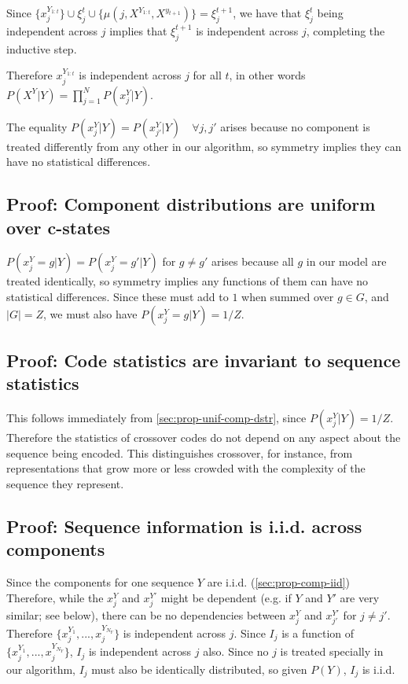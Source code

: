 \documentclass{article}
\begin{document}
Since $\{x_j^{Y_{1:t}}\} \cup \xi^t_j \cup \{\mu(j, X^{Y_{1:t}}, X^{y_{t+1}})\} = \xi^{t+1}_j$, we have that $\xi^t_j$ being independent across $j$ implies that $\xi^{t+1}_j$ is independent across $j$, completing the inductive step.

Therefore $x_j^{Y_{1:t}}$ is independent across $j$ for all $t$, in other words $P(X^Y|Y) = \prod\limits_{j=1}^N P(x^Y_j|Y)$.

The equality $P(x^Y_j|Y) = P(x^Y_{j'}|Y) \quad \forall j, j'$ arises because no component is treated differently from any other in our algorithm, so symmetry implies they can have no statistical differences.

\subsection{Proof: Component distributions are uniform over c-states}

$P(x^Y_j = g|Y) = P(x^Y_j = g'|Y)$ for $g \neq g'$ arises because all $g$ in our model are treated identically, so symmetry implies any functions of them can have no statistical differences. Since these must add to $1$ when summed over $g \in G$, and $|G| = Z$, we must also have $P(x^Y_j = g|Y) = 1/Z.$

\subsection{Proof: Code statistics are invariant to sequence statistics}

This follows immediately from \ref{sec:prop-unif-comp-dstr}, since $P(x^Y_j|Y) = 1/Z$. Therefore the statistics of crossover codes do not depend on any aspect about the sequence being encoded. This distinguishes crossover, for instance, from representations that grow more or less crowded with the complexity of the sequence they represent.

\subsection{Proof: Sequence information is i.i.d. across components}

Since the components for one sequence $Y$ are i.i.d. (\ref{sec:prop-comp-iid}) Therefore, while the $x^Y_j$ and $x^{Y'}_j$ might be dependent (e.g. if $Y$ and $Y'$ are very similar; see below), there can be no dependencies between $x^Y_j$ and $x^{Y'}_{j'}$ for $j \neq j'$. Therefore $\{x^{Y_1}_j, ..., x^{Y_{N_Y}}_j\}$ is independent across $j$. Since $I_j$ is a function of $\{x^{Y_1}_j, ..., x^{Y_{N_Y}}_j\}$, $I_j$ is independent across $j$ also. Since no $j$ is treated specially in our algorithm, $I_j$ must also be identically distributed, so given $P(Y)$, $I_j$ is i.i.d.
\end{document}
